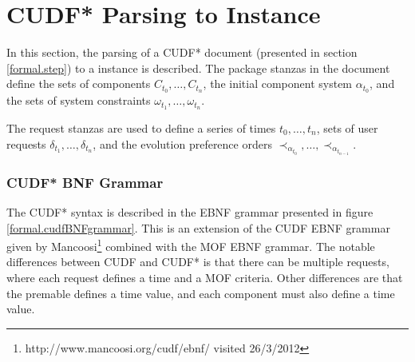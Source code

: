 \appendix{}

\chapter{CUDF* Parsing to \modelname Instance}
\label{apx.cudf}
In this section, the parsing of a CUDF* document (presented in section \ref{formal.step}) to a \modelname instance is described.
The package stanzas in the document define the sets of components $C_{t_0},\ldots,C_{t_n}$, the initial component system $\alpha_{t_0}$, 
and the sets of system constraints $\omega_{t_1},\ldots,\omega_{t_n}$.

The request stanzas are used to define a series of times $t_0,\ldots,t_n$, sets of user requests $\delta_{t_1},\ldots,\delta_{t_n}$,
and the evolution preference orders $\prec_{\alpha_{t_0}},\ldots, \prec_{\alpha_{t_{n-1}}}$.

\subsection{CUDF* BNF Grammar}
The CUDF* syntax is described in the EBNF grammar presented in figure \ref{formal.cudfBNFgrammar}.
This is an extension of the CUDF EBNF grammar given by Mancoosi\footnote{http://www.mancoosi.org/cudf/ebnf/ visited 26/3/2012}
combined with the MOF EBNF grammar.
The notable differences between CUDF and CUDF* is that there can be multiple requests, where each request defines a time and a MOF criteria.
Other differences are that the premable defines a time value,  
and each component must also define a time value.

